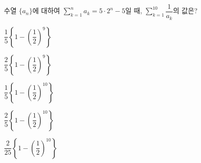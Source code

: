 수열 $\{a_n\}$에 대하여 $\displaystyle\sum_{k=1}^{n} a_k=5\cdot2^n-5$일 때, $\displaystyle\sum_{k=1}^{10} \dfrac{1}{a_k}$의 값은?
\begin{choicesii}{\rule[-3ex]{0pt}{8ex}$\dfrac{1}{5}\left\{1-\left(\dfrac{1}{2}\right)^{9}\right\}$}{\rule[-3ex]{0pt}{8ex}$\dfrac{2}{5}\left\{1-\left(\dfrac{1}{2}\right)^{9}\right\}$}{\rule[-3ex]{0pt}{8ex}$\dfrac{1}{5}\left\{1-\left(\dfrac{1}{2}\right)^{10}\right\}$}{\rule[-3ex]{0pt}{8ex}$\dfrac{2}{5}\left\{1-\left(\dfrac{1}{2}\right)^{10}\right\}$}{\rule[-3ex]{0pt}{8ex}$\dfrac{2}{25}\left\{1-\left(\dfrac{1}{2}\right)^{10}\right\}$}\end{choicesii}
